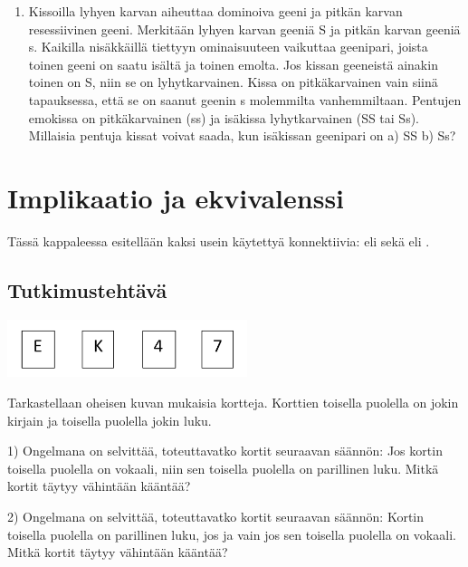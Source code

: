 \begin{enumerate}
\item
Kissoilla lyhyen karvan aiheuttaa dominoiva geeni ja pitkän karvan resessiivinen geeni. Merkitään lyhyen karvan geeniä S ja pitkän karvan geeniä s. Kaikilla nisäkkäillä tiettyyn ominaisuuteen vaikuttaa geenipari, joista toinen geeni on saatu isältä ja toinen emolta. Jos kissan geeneistä ainakin toinen on S, niin se on lyhytkarvainen. Kissa on pitkäkarvainen vain siinä tapauksessa, että se on saanut geenin s molemmilta vanhemmiltaan.  Pentujen emokissa on pitkäkarvainen (ss) ja isäkissa lyhytkarvainen (SS tai Ss). Millaisia pentuja kissat voivat saada, kun isäkissan geenipari on a) SS b) Ss?

\end{enumerate}



\section{Implikaatio ja ekvivalenssi}
Tässä kappaleessa esitellään kaksi usein käytettyä konnektiivia:  eli  sekä  eli .

\subsection*{Tutkimustehtävä}

\begin{center}
\includegraphics[width=7cm]{pictures/piaget}
\end{center}

Tarkastellaan oheisen kuvan mukaisia kortteja. Korttien toisella puolella on jokin kirjain ja toisella puolella jokin luku.

1) Ongelmana on selvittää, toteuttavatko kortit seuraavan säännön: Jos kortin toisella puolella on vokaali, niin sen toisella puolella on parillinen luku. Mitkä kortit täytyy vähintään kääntää?

2) Ongelmana on selvittää, toteuttavatko kortit seuraavan säännön: Kortin toisella puolella on parillinen luku, jos ja vain jos sen toisella puolella on vokaali. Mitkä kortit täytyy vähintään kääntää?

